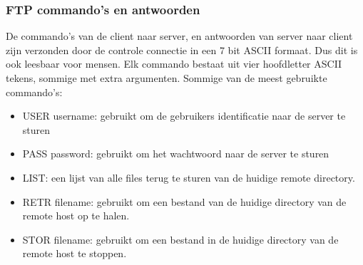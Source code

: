 \subsubsection{FTP commando’s en antwoorden}

De commando’s van de client naar server, en antwoorden van server naar client zijn verzonden door de controle connectie in een 7 bit ASCII formaat. Dus dit is ook leesbaar voor mensen. Elk commando bestaat uit vier hoofdletter ASCII tekens, sommige met extra argumenten. Sommige van de meest gebruikte commando’s:
\begin{itemize}
   \item USER username: gebruikt om de gebruikers identificatie naar de server te sturen
\item PASS password: gebruikt om het wachtwoord naar de server te sturen
\item LIST: een lijst van alle files terug te sturen van de huidige remote directory.
\item RETR filename: gebruikt om een bestand van de huidige directory van de remote host op te halen.
\item STOR filename: gebruikt om een bestand in de huidige directory van de remote host te stoppen.
\end{itemize}

